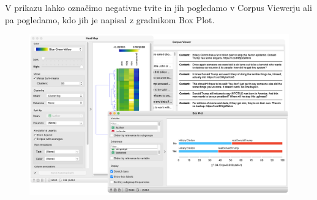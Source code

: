 V prikazu lahko označimo negativne tvite in jih pogledamo v Corpus Viewerju ali pa pogledamo, kdo jih je napisal z gradnikom Box Plot.

\begin{figure}[h]
    \includegraphics[width=\linewidth]{sentiment-2.png}%
    \caption{}
    \label{fig:011-sentiment2}
\end{figure}
